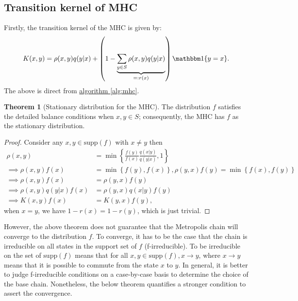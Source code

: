 \documentclass[]{article}
\theoremstyle{definition}
\newtheorem{theorem}{Theorem}       %
\begin{document}
    \subsection{Transition kernel of MHC}
        Firstly, the transition kernel of the MHC is given by: 
        \begin{align*}
            K(x, y) = \rho(x, y)q(y|x) + \left(1 - \underbrace{\sum_{y \in S}^{}\rho(x, y)q(y|x)}_{=:r(x)}\right) \mathbbm 1\{y = x\}. 
        \end{align*}
        The above is direct from \hyperref[alg:mhc]{algorithm \ref*{alg:mhc}}. 
        \begin{theorem}[Stationary distribution for the MHC]\label{thm:sat_distr}
            The distribution $f$ satisfies the detailed balance conditions when $x, y\in S$; consequently, the MHC has $f$ as the stationary distribution. 
        \end{theorem}
        \begin{proof}
            Consider any $x, y\in \text{supp}(f)$ with $x\neq y$ then
            \begin{align*}
                \rho(x, y) &= \min\left\lbrace
                \frac{f(y)}{f(x)}\frac{q(x|y)}{q(y|x)}, 1
                \right\rbrace
                \\
                \implies
                \rho(x, y)f(x) &= \min\left\lbrace
                    f(y), f(x)
                \right\rbrace, \rho(y, x) f(y) = 
                \min\left\lbrace
                    f(x), f(y)
                \right\rbrace
                \\
                \implies
                \rho(x, y)f(x) &= \rho(y, x)f(y)
                \\
                \implies
                \rho(x, y)q(y|x)f(x) &= 
                \rho(y, x)q(x|y)f(y)
                \\
                \implies
                K(x, y)f(x) &= K(y, x)f(y), 
            \end{align*}
            when $x = y$, we have $1 - r(x)= 1 - r(y)$, which is just trivial. 
        \end{proof}
        However, the above theorem does not guarantee that the Metropolis chain will converge to the distribution $f$. To converge, it has to be the case that the chain is irreducible on all states in the support set of $f$ (f-irreducible). To be irreducible on the set of $\text{supp}(f)$ means that for all $x, y \in \text{supp}(f), x \rightarrow y$, where $x\rightarrow y$ means that it is possible to commute from the state $x$ to $y$. In general, it is better to judge f-irreducible conditions on a case-by-case basis to determine the choice of the base chain. Nonetheless, the below theorem quantifies a stronger condition to assert the convergence. 
\end{document}
